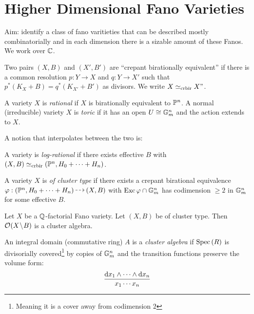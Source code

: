 \documentclass[12pt]{article}
\begin{document}
\section{Higher Dimensional Fano Varieties}

Aim: identify a class of fano varitieties that can be described mostly combinatorially and in each dimension there is a sizable amount of these Fanos. We work over $\CC$.

\begin{defn}
Two pairs $(X, B)$ and $(X', B')$ are ``crepant birationally equivalent'' if there is a common resolution $p : Y \to X$ and $q : Y \to X'$ such that $p^* (K_X + B) = q^* (K_{X'} + B')$ as divisors. We write $X \simeq_{\text{crbir}} X"$.
\end{defn}


\begin{defn}
A variety $X$ is \textit{rational} if $X$ is birationally equivalent to $\P^n$. A normal (irreducible) variety $X$ is \textit{toric} if it has an open $U \cong \Gm^n$ and the action extends to $X$. 
\end{defn}

A notion that interpolates between the two is:

\begin{defn}
A variety is \textit{log-rational} if there exists effective $B$ with $(X, B) \simeq_{\text{crbir}} (\P^n, H_0 + \cdots + H_n)$.
\end{defn}

\begin{defn}
A variety $X$ is \textit{of cluster type} if there exists a crepant birational equivalence $\varphi : (\P^n, H_0 + \cdots + H_n) \rat (X, B)$ with $\Exc{\varphi} \cap \Gm^n$ has codimension $\ge 2$ in $\Gm^n$ for some effective $B$. 
\end{defn}

\begin{theorem} 
Let $X$ be a $\Q$-factorial Fano variety. Let $(X, B)$ be of cluster type. Then $\struct{}(X \sm B)$ is a cluster algebra. 
\end{theorem}

\begin{defn}
An integral domain (commutative ring) $A$ is a \textit{cluster algebra} if $\Spec{R}$ is divisorially covered\footnote{Meaning it is a cover away from codimension $2$} by copies of $\Gm^n$ and the transition functions preserve the volume form:
\[ \frac{\d{x_1} \wedge \cdots \wedge \d{x_n}}{x_1 \cdots x_n} \]
\end{defn}
\end{document}
